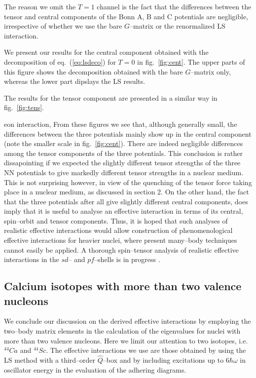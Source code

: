 The reason we omit the $T=1$ channel is the fact that the
differences between the tensor and central components of the Bonn A,
B and C potentials are negligible, irrespective of whether we use
the bare $G$--matrix or the renormalized LS interaction.

We present our results for the central component obtained with the decomposition
of eq.\ (\ref{eq:lsdeco}) for $T=0$ in fig.\ \ref{fig:cent}. The upper parts of this
figure shows the decomposition obtained with the bare $G$--matrix only, whereas the lower
part dipslays the LS results.

The results for the tensor component are presented in a similar 
way in fig.\ \ref{fig:tens}.

eon interaction,
From these figures we see that, although generally small, the differences between
the three potentials mainly show up in the central component (note the smaller
scale in fig.\ \ref{fig:cent}). There are indeed negligible differences among the
tensor components of the three potentials. This conclusion is rather dissapointing
if we expected the slightly different tensor strengths of the three NN potentials
to give markedly different tensor strengths in a nuclear medium. This is not
surprising however, in view of the quenching of the tensor force taking place 
in a nuclear medium, as discussed in section 2. 
On the other hand, the fact that the three potentials after all give slightly
different central components, does imply that it is useful to analyse an
effective interaction in terms of its central, spin--orbit and tensor 
components. Thus, it is hoped that such analyses of realistic effective interactions
would allow construction of phenomenological effective interactions
for heavier nuclei, where present many--body techniques cannot easily be applied.
A thorough spin--tensor analysis of realistic effective interactions in the $sd$--
and $pf$--shells is in progress
\cite{hhos92}.



\subsection{Calcium isotopes with more than two valence nucleons}
We conclude our discussion on the derived effective interactions by
employing the two--body matrix elements in the calculation of the eigenvalues
for nuclei with more than two valence nucleons. Here we limit our
attention to two isotopes, i.e. $^{44}Ca$
and $^{44}Sc$. The effective
interactions we use are those obtained by using the LS method with a
third--order $\hat{Q}$--box and by including  excitations up to
$6\hbar\omega$ in oscillator energy in the evaluation of the adhering
diagrams.


